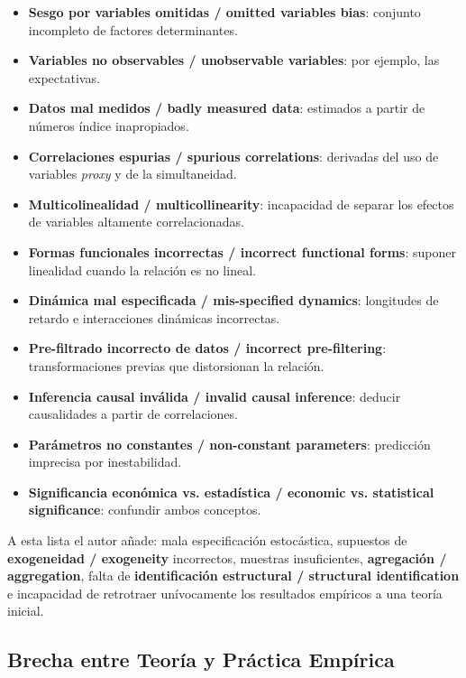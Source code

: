 \documentclass[12pt]{article}
\begin{document}
\begin{itemize}
  \item \textbf{Sesgo por variables omitidas / omitted variables bias}: conjunto incompleto de factores determinantes.
  \item \textbf{Variables no observables / unobservable variables}: por ejemplo, las expectativas.
  \item \textbf{Datos mal medidos / badly measured data}: estimados a partir de n\'umeros \'indice inapropiados.
  \item \textbf{Correlaciones espurias / spurious correlations}: derivadas del uso de variables \textit{proxy} y de la simultaneidad.
  \item \textbf{Multicolinealidad / multicollinearity}: incapacidad de separar los efectos de variables altamente correlacionadas.
  \item \textbf{Formas funcionales incorrectas / incorrect functional forms}: suponer linealidad cuando la relaci\'on es no lineal.
  \item \textbf{Din\'amica mal especificada / mis-specified dynamics}: longitudes de retardo e interacciones din\'amicas incorrectas.
  \item \textbf{Pre-filtrado incorrecto de datos / incorrect pre-filtering}: transformaciones previas que distorsionan la relaci\'on.
  \item \textbf{Inferencia causal inv\'alida / invalid causal inference}: deducir causalidades a partir de correlaciones.
  \item \textbf{Par\'ametros no constantes / non-constant parameters}: predicci\'on imprecisa por inestabilidad.
  \item \textbf{Significancia econ\'omica vs. estad\'istica / economic vs. statistical significance}: confundir ambos conceptos.
\end{itemize}

A esta lista el autor a\~nade: mala especificaci\'on estoc\'astica, supuestos de \textbf{exogeneidad / exogeneity} incorrectos, muestras insuficientes, \textbf{agregaci\'on / aggregation}, falta de \textbf{identificaci\'on estructural / structural identification} e incapacidad de retrotraer un\'ivocamente los resultados emp\'iricos a una teor\'ia inicial.

\subsection{Brecha entre Teor\'ia y Pr\'actica Emp\'irica}
\end{document}
